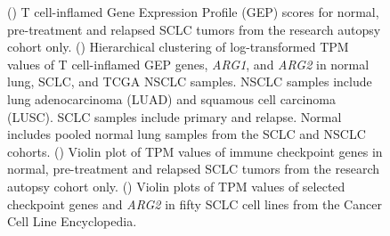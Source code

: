 \begin{figure}[p]
    \caption[GEP scores and associated gene TPMs.]{() T cell-inflamed Gene Expression Profile (GEP) scores for normal, pre-treatment and relapsed SCLC tumors from the research autopsy cohort only. () Hierarchical clustering of log-transformed TPM values of T cell-inflamed GEP genes, \textit{ARG1}, and \textit{ARG2} in normal lung, SCLC, and TCGA NSCLC samples. NSCLC samples include lung adenocarcinoma (LUAD) and squamous cell carcinoma (LUSC)\@. SCLC samples include primary and relapse. Normal includes pooled normal lung samples from the SCLC and NSCLC cohorts. () Violin plot of TPM values of immune checkpoint genes in normal, pre-treatment and relapsed SCLC tumors from the research autopsy cohort only. () Violin plots of TPM values of selected checkpoint genes and \textit{ARG2} in fifty SCLC cell lines from the Cancer Cell Line Encyclopedia.}
    \label{fig:sclc:gep_detail}
\end{figure}

